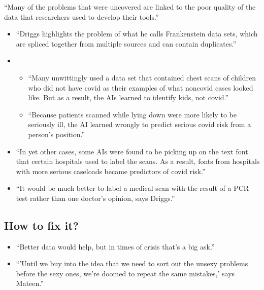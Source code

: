 \documentclass[letterpaper,10pt,english]{jupyterBook}
\begin{document}
\sphinxAtStartPar
“Many of the problems that were uncovered are linked to the poor quality of the data that researchers used to develop their tools.”
\begin{itemize}
\item {} 
\sphinxAtStartPar
{} “Driggs highlights the problem of what he calls Frankenstein data sets, which are spliced together from multiple sources and can contain duplicates.”

\item {} 
\sphinxAtStartPar
{} 
\begin{itemize}
\item {} 
\sphinxAtStartPar
“Many unwittingly used a data set that contained chest scans of children who did not have covid as their examples of what non\sphinxhyphen{}covid cases looked like. But as a result, the AIs learned to identify kids, not covid.”

\item {} 
\sphinxAtStartPar
“Because patients scanned while lying down were more likely to be seriously ill, the AI learned wrongly to predict serious covid risk from a person’s position.”

\end{itemize}

\item {} 
\sphinxAtStartPar
{} “In yet other cases, some AIs were found to be picking up on the text font that certain hospitals used to label the scans. As a result, fonts from hospitals with more serious caseloads became predictors of covid risk.”

\item {} 
\sphinxAtStartPar
{} “It would be much better to label a medical scan with the result of a PCR test rather than one doctor’s opinion, says Driggs.”


\end{itemize}


\subsection{How to fix it?}
\label{\detokenize{dependent_data:how-to-fix-it}}\begin{itemize}
\item {} 
\sphinxAtStartPar
“Better data would help, but in times of crisis that’s a big ask.”

\item {} 
\sphinxAtStartPar
“’Until we buy into the idea that we need to sort out the unsexy problems before the sexy ones, we’re doomed to repeat the same mistakes,’ says Mateen.”


\end{itemize}
\end{document}
